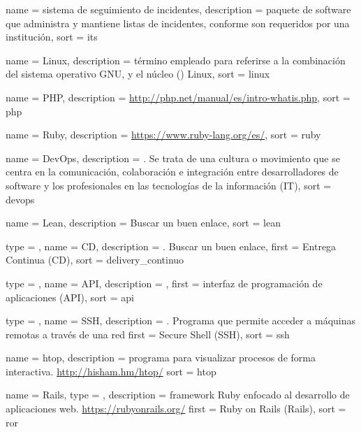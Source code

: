  {
  name        = {sistema de seguimiento de incidentes},
  description =
    {paquete de software que administra y mantiene listas de incidentes,
    conforme son requeridos por una institución},
  sort        = {its}
}

 {
  name        = {Linux},
  description =
    {término empleado para referirse a la combinación del sistema operativo
    GNU, y el núcleo () Linux},
  sort        = {linux}
}

 {
  name        = {PHP},
  description =
    {
    \url{http://php.net/manual/es/intro-whatis.php}},
  sort        = {php}
}

 {
  name        = {Ruby},
  description = {\url{https://www.ruby-lang.org/es/}},
  sort        = {ruby}
}

 {
  name        = {DevOps},
  description =
    {. Se trata de una cultura o movimiento que se
    centra en la comunicación, colaboración e integración entre desarrolladores
    de software y los profesionales en las tecnologías de la información
    (IT)},
  sort        = {devops}
}

 {
  name        = {Lean},
  description = {Buscar un buen enlace},
  sort        = {lean}
}

 {
  type        = \acronymtype,
  name        = {CD},
  description = {. Buscar un buen enlace},
  first       = {Entrega Continua (CD)},
  sort        = {delivery_continuo}
}

 {
  type        = \acronymtype,
  name        = {API},
  description = {},
  first       = {interfaz de programación de aplicaciones (API)},
  sort        = {api}
}

 {
  type        = \acronymtype,
  name        = {SSH},
  description =
    {. Programa que permite acceder a máquinas remotas a
    través de una red}
  first       = {Secure Shell (SSH)},
  sort        = {ssh}
}

 {
  name        = {htop},
  description =
    {programa para visualizar procesos de forma interactiva.
    \url{http://hisham.hm/htop/}}
  sort        = {htop}
}

 {
  name        = {Rails},
  type        = \acronymtype,
  description =
    {framework Ruby enfocado al desarrollo de aplicaciones web.
    \url{https://rubyonrails.org/}}
  first       = {Ruby on Rails (Rails)},
  sort        = {ror}
}

